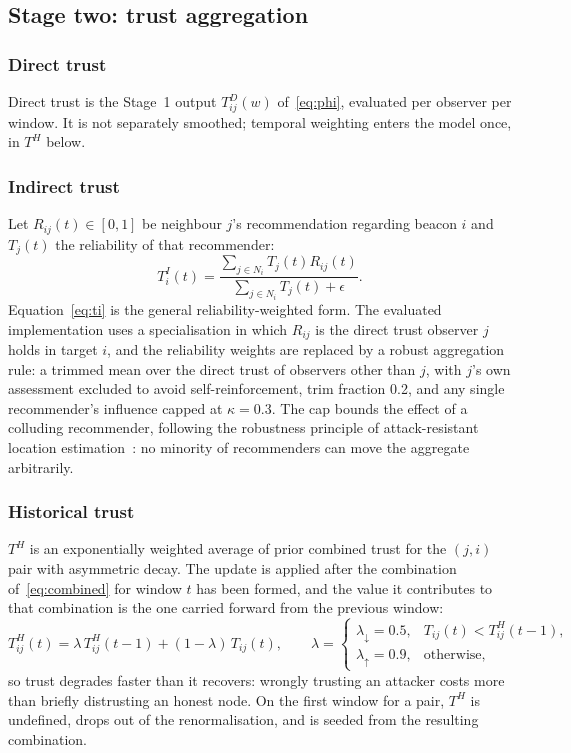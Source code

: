 \subsection{Stage two: trust aggregation}

\subsubsection{Direct trust}

Direct trust is the Stage~1 output $T^D_{ij}(w)$ of~\eqref{eq:phi}, evaluated
per observer per window. It is not separately smoothed; temporal weighting enters the model once, in
$T^H$ below.

\subsubsection{Indirect trust}

Let $R_{ij}(t) \in [0,1]$ be neighbour $j$'s recommendation regarding beacon
$i$ and $T_j(t)$ the reliability of that recommender:
\begin{equation}
\label{eq:ti}
T^I_i(t) = \frac{\sum_{j \in N_i} T_j(t) R_{ij}(t)}{\sum_{j \in N_i} T_j(t) + \epsilon}.
\end{equation}
Equation~\eqref{eq:ti} is the general reliability-weighted form. The evaluated
implementation uses a specialisation in which $R_{ij}$ is the direct trust
observer $j$ holds in target $i$, and the reliability weights are replaced by a
robust aggregation rule: a trimmed mean over the direct trust of observers
other than $j$, with $j$'s own assessment excluded to avoid self-reinforcement,
trim fraction 0.2, and any single recommender's influence capped at
$\kappa = 0.3$. The cap bounds the effect of a colluding recommender, following
the robustness principle of attack-resistant location
estimation~\cite{liu2008attack}: no minority of recommenders can move the
aggregate arbitrarily.

\subsubsection{Historical trust}

$T^H$ is an exponentially weighted average of prior combined trust for the
$(j,i)$ pair with asymmetric decay. The update is applied after the
combination of~\eqref{eq:combined} for window $t$ has been formed, and the
value it contributes to that combination is the one carried forward from the
previous window:
\begin{equation}
\label{eq:th}
T^H_{ij}(t) = \lambda\, T^H_{ij}(t-1) + (1-\lambda)\, T_{ij}(t),
\qquad
\lambda =
\begin{cases}
\lambda_\downarrow = 0.5, & T_{ij}(t) < T^H_{ij}(t-1),\\
\lambda_\uparrow = 0.9, & \text{otherwise,}
\end{cases}
\end{equation}
so trust degrades faster than it recovers: wrongly trusting an attacker costs
more than briefly distrusting an honest node. On the first window for a pair,
$T^H$ is undefined, drops out of the renormalisation, and is seeded from the
resulting combination.

